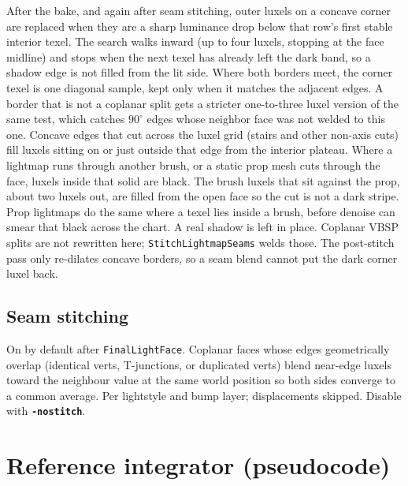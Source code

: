 \documentclass[11pt,a4paper]{article}
\newcommand{\flag}[1]{\texttt{\bfseries #1}}
\newcommand{\code}[1]{\texttt{#1}}
\begin{document}
After the bake, and again after seam stitching, outer luxels on a concave
corner are replaced when they are a sharp luminance drop below that row's
first stable interior texel. The search walks inward (up to four luxels,
stopping at the face midline) and stops when the next texel has already left
the dark band, so a shadow edge is not filled from the lit side. Where both
borders meet, the corner texel is one diagonal sample, kept only when it
matches the adjacent edges. A border that is not a coplanar split gets a
stricter one-to-three luxel version of the same test, which catches
$90^{\circ}$ edges whose neighbor face was not welded to this one. Concave
edges that cut across the luxel grid (stairs and other non-axis cuts) fill
luxels sitting on or just outside that edge from the interior plateau.
Where a lightmap runs through another brush, or a static prop mesh cuts
through the face, luxels inside that solid are black. The brush luxels that
sit against the prop, about two luxels out, are filled from the open face so
the cut is not a dark stripe. Prop lightmaps do the same where a
texel lies inside a brush, before denoise can smear that black across the
chart. A real shadow is left in place.
Coplanar VBSP splits are not rewritten here; \code{StitchLightmapSeams} welds
those. The post-stitch pass only re-dilates concave borders, so a seam blend
cannot put the dark corner luxel back.

\subsection{Seam stitching}

On by default after \code{FinalLightFace}. Coplanar faces whose edges
geometrically overlap (identical verts, T-junctions, or duplicated verts)
blend near-edge luxels toward the neighbour value at the same world position
so both sides converge to a common average. Per lightstyle and bump layer;
displacements skipped. Disable with \flag{-nostitch}.

\section{Reference integrator (pseudocode)}
\label{sec:pseudocode}
\end{document}
